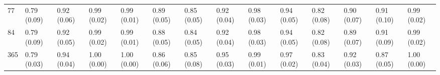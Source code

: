 \begin{tabular}{llllllllllllll}
77  &  0.79 (0.09) &  0.92 (0.06) &   0.99 (0.02) &  0.99 (0.01) &  0.89 (0.05) &  0.85 (0.05) &  0.92 (0.04) &  0.98 (0.03) &  0.94 (0.05) &  0.82 (0.08) &  0.90 (0.07) &  0.91 (0.10) &  0.99 (0.02) \\
84  &  0.79 (0.09) &  0.92 (0.05) &   0.99 (0.02) &  0.99 (0.01) &  0.88 (0.05) &  0.84 (0.05) &  0.92 (0.04) &  0.98 (0.03) &  0.94 (0.05) &  0.82 (0.08) &  0.89 (0.07) &  0.91 (0.09) &  0.99 (0.02) \\
365 &  0.79 (0.03) &  0.94 (0.04) &   1.00 (0.00) &  1.00 (0.00) &  0.86 (0.06) &  0.85 (0.08) &  0.95 (0.03) &  0.99 (0.01) &  0.97 (0.02) &  0.83 (0.04) &  0.92 (0.03) &  0.87 (0.05) &  1.00 (0.00) \\
\bottomrule
\end{tabular}
